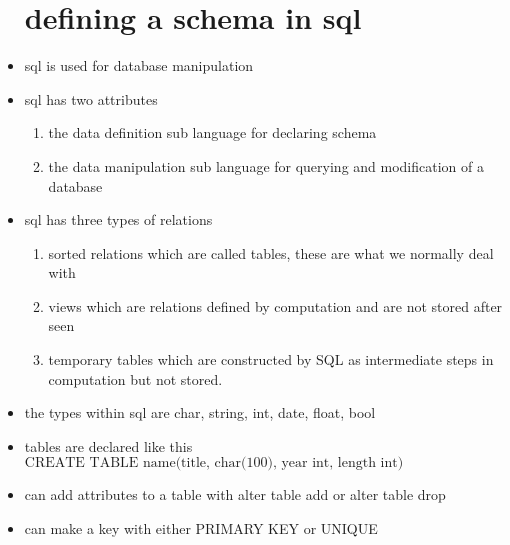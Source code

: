 \documentclass{article}
\begin{document}
\begin{itemize}
\section*{defining a schema in sql }
\item sql is used for database manipulation 
\item sql has two attributes 
\begin{enumerate}
    \item the data definition sub language for declaring schema 
    \item the data manipulation sub language for querying and  modification of a database 
\end{enumerate}
\item sql has three types of relations 
\begin{enumerate}
    \item sorted relations which are called tables, these are what we normally deal with 
    \item views which are relations defined by computation and are not stored after seen 
    \item temporary tables which are constructed by SQL as intermediate steps in computation but not stored. 
\end{enumerate}
\item  the types within sql are char, string, int, date, float, bool
\item tables are declared like this $\text{CREATE TABLE name(title, char(100), year int, length int)} $
\item can add attributes to a table with alter table add or alter table drop 
\item can make a key with either PRIMARY KEY or UNIQUE 

\end{itemize}
\end{document}
